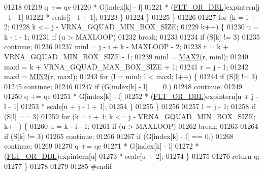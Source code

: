 \begin{DoxyCode}
01218 
01219         q += qe
01220              * G[index[k] - l]
01221              * (\hyperlink{group__data__structures_ga31125aeace516926bf7f251f759b6126}{FLT\_OR\_DBL})expintern[j - l - 1]
01222              * scale[j - l + 1];
01223       \}
01224     \}
01225   \}
01226 
01227   \textcolor{keywordflow}{for} (k = i + 2;
01228        k <= j - VRNA\_GQUAD\_MIN\_BOX\_SIZE;
01229        k++) \{
01230     u = k - i - 1;
01231     \textcolor{keywordflow}{if} (u > MAXLOOP)
01232       \textcolor{keywordflow}{break};
01233 
01234     \textcolor{keywordflow}{if} (S[k] != 3)
01235       \textcolor{keywordflow}{continue};
01236 
01237     minl  = j - i + k - MAXLOOP - 2;
01238     r     = k + VRNA\_GQUAD\_MIN\_BOX\_SIZE - 1;
01239     minl  = \hyperlink{group__utils_ga33297b3679c713b0c4d897cd0fe3b122}{MAX2}(r, minl);
01240     maxl  = k + VRNA\_GQUAD\_MAX\_BOX\_SIZE + 1;
01241     r     = j - 1;
01242     maxl  = \hyperlink{group__utils_gae0b9cd0ce090bd69b951aa73e8fa4f7d}{MIN2}(r, maxl);
01243     \textcolor{keywordflow}{for} (l = minl; l < maxl; l++) \{
01244       \textcolor{keywordflow}{if} (S[l] != 3)
01245         \textcolor{keywordflow}{continue};
01246 
01247       \textcolor{keywordflow}{if} (G[index[k] - l] == 0.)
01248         \textcolor{keywordflow}{continue};
01249 
01250       q += qe
01251            * G[index[k] - l]
01252            * (\hyperlink{group__data__structures_ga31125aeace516926bf7f251f759b6126}{FLT\_OR\_DBL})expintern[u + j - l - 1]
01253            * scale[u + j - l + 1];
01254     \}
01255   \}
01256 
01257   l = j - 1;
01258   \textcolor{keywordflow}{if} (S[l] == 3)
01259     \textcolor{keywordflow}{for} (k = i + 4; k <= j - VRNA\_GQUAD\_MIN\_BOX\_SIZE; k++) \{
01260       u = k - i - 1;
01261       \textcolor{keywordflow}{if} (u > MAXLOOP)
01262         \textcolor{keywordflow}{break};
01263 
01264       \textcolor{keywordflow}{if} (S[k] != 3)
01265         \textcolor{keywordflow}{continue};
01266 
01267       \textcolor{keywordflow}{if} (G[index[k] - l] == 0.)
01268         \textcolor{keywordflow}{continue};
01269 
01270       q += qe
01271            * G[index[k] - l]
01272            * (\hyperlink{group__data__structures_ga31125aeace516926bf7f251f759b6126}{FLT\_OR\_DBL})expintern[u]
01273            * scale[u + 2];
01274     \}
01275 
01276   \textcolor{keywordflow}{return} q;
01277 \}
01278 
01279 
01285 \textcolor{preprocessor}{#endif}
\end{DoxyCode}
